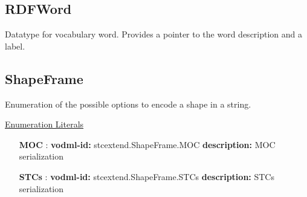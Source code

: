   \subsection{RDFWord}
  \label{sect:stcextend.RDFWord}
  Datatype for vocabulary word. Provides a pointer to the word description and a label.

  \subsection{ShapeFrame}
  \label{sect:stcextend.ShapeFrame}

  Enumeration of the possible options to encode a shape in a string.

  \noindent \underline{Enumeration Literals}
  \vspace{-\parsep}
  \small
  \begin{itemize}
  
    \item[\textbf{MOC}]: \textbf{vodml-id:} stcextend.ShapeFrame.MOC \newline
          \textbf{description:} MOC serialization
    \item[\textbf{STCs}]: \textbf{vodml-id:} stcextend.ShapeFrame.STCs \newline
          \textbf{description:} STCs serialization
  \end{itemize}
  \normalsize
